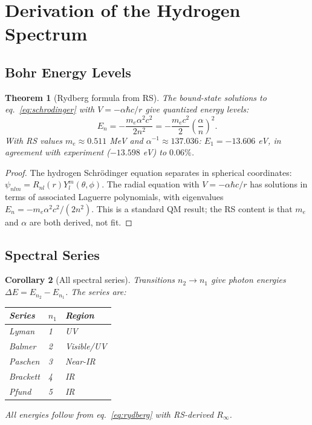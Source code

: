 \documentclass[12pt,a4paper]{article}
\newtheorem{theorem}{Theorem}[section]
\newtheorem{corollary}[theorem]{Corollary}
\theoremstyle{definition}
\theoremstyle{remark}
\begin{document}
\section{Derivation of the Hydrogen Spectrum}

\subsection{Bohr Energy Levels}

\begin{theorem}[Rydberg formula from RS]\label{thm:rydberg}
The bound-state solutions to eq.~\eqref{eq:schrodinger} with
$V = -\alpha\hbar c/r$ give quantized energy levels:
\begin{equation}
  E_n = -\frac{m_e\alpha^2 c^2}{2n^2}
      = -\frac{m_e c^2}{2}\left(\frac{\alpha}{n}\right)^2.
\end{equation}
With RS values $m_e \approx 0.511$ MeV and $\alpha^{-1} \approx 137.036$:
$E_1 = -13.606$ eV, in agreement with experiment ($-13.598$ eV) to
$0.06\%$.
\end{theorem}

\begin{proof}
The hydrogen Schr\"{o}dinger equation separates in spherical coordinates:
$\psi_{nlm} = R_{nl}(r) Y_l^m(\theta,\phi)$.  The radial equation
with $V = -\alpha\hbar c/r$ has solutions in terms of associated
Laguerre polynomials, with eigenvalues $E_n = -m_e\alpha^2c^2/(2n^2)$.
This is a standard QM result; the RS content is that $m_e$ and $\alpha$
are both derived, not fit.
\end{proof}

\subsection{Spectral Series}

\begin{corollary}[All spectral series]\label{cor:series}
Transitions $n_2 \to n_1$ give photon energies $\Delta E = E_{n_2} - E_{n_1}$.
The series are:
\begin{center}
\begin{tabular}{lll}
\toprule
Series & $n_1$ & Region \\
\midrule
Lyman & 1 & UV \\
Balmer & 2 & Visible/UV \\
Paschen & 3 & Near-IR \\
Brackett & 4 & IR \\
Pfund & 5 & IR \\
\bottomrule
\end{tabular}
\end{center}
All energies follow from eq.~\eqref{eq:rydberg} with RS-derived $R_\infty$.
\end{corollary}
\end{document}

